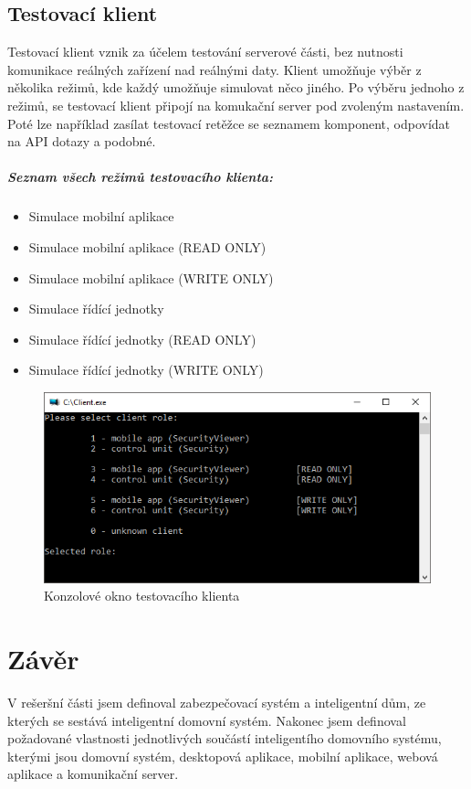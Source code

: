 \documentclass[FM,DP]{tulthesis}  %
\begin{document}
\section{Testovací klient}
Testovací klient vznik za účelem testování serverové části, bez nutnosti komunikace reálných zařízení nad reálnými daty. Klient umožňuje výběr z několika režimů, kde každý umožňuje simulovat něco jiného. Po výběru jednoho z režimů, se testovací klient připojí na komukační server pod zvoleným nastavením. Poté lze například zasílat testovací retěžce se seznamem komponent, odpovídat na API dotazy a podobné.

\paragraph{Seznam všech režimů testovacího klienta:}
\begin{itemize}
\item Simulace mobilní aplikace
\item Simulace mobilní aplikace (READ ONLY)
\item Simulace mobilní aplikace (WRITE ONLY)
\item Simulace řídící jednotky
\item Simulace řídící jednotky (READ ONLY)
\item Simulace řídící jednotky (WRITE ONLY)
\end{itemize}

\begin{figure}[H]
\begin{center}
\includegraphics[width=\textwidth]{images/testingClient.png}
\caption{Konzolové okno testovacího klienta}
\label{image}
\end{center}
\end{figure}



\chapter{Závěr}
V rešeršní části jsem definoval zabezpečovací systém a inteligentní dům, ze kterých se sestává inteligentní domovní systém. Nakonec jsem definoval požadované vlastnosti jednotlivých součástí inteligentího domovního systému, kterými jsou domovní systém, desktopová aplikace, mobilní aplikace, webová aplikace a komunikační server. 
\end{document}
